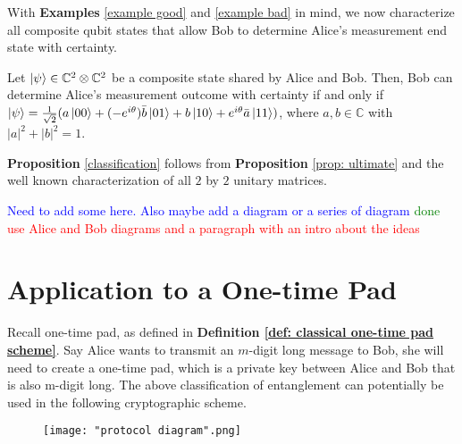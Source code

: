 


With {\bf{Examples}} \ref{example good} and \ref{example bad} in mind, we now characterize all composite qubit states that allow Bob to determine Alice's measurement end state with certainty.  
\begin{prop}
\label{classification}
Let $\ket{\psi} \in {\mathbb{C}}^2 \otimes {\mathbb{C}}^2$ be a composite state shared by Alice and Bob.  Then, Bob can determine Alice's measurement outcome with certainty if and only if $\ket{\psi}=\frac{1}{\sqrt{2}}(a\ket{00}+(-e^{i\theta})\Bar{b}\ket{01}+b\ket{10}+e^{i\theta}\Bar{a}\ket{11})$, where $a, b \in \mathbb{C}$ with $|a|^2+|b|^2=1$.
\end{prop}
{\bf{Proposition}} \ref{classification} follows from {\bf{Proposition}} \ref{prop: ultimate} and the well known characterization of all $2$ by $2$ unitary matrices.


\pagebreak

\textcolor{blue}{Need to add some here.  Also maybe add a diagram or a series of diagram} \textcolor{green}{done}
\textcolor{red}{use Alice and Bob diagrams and a paragraph with an intro about the ideas}
\section{Application to a One-time Pad}
Recall one-time pad, as defined in \textbf{Definition \ref{def: classical one-time pad scheme}}. Say Alice wants to transmit an $m$-digit long message to Bob, she will need to create a one-time pad, which is a private key between Alice and Bob that is also m-digit long. The above classification of entanglement can potentially be used in the following cryptographic scheme.

\begin{figure}[h]
    \centering
    \texttt{[image: "protocol diagram".png]}
    \label{fig:protocol diagram}
\end{figure}


